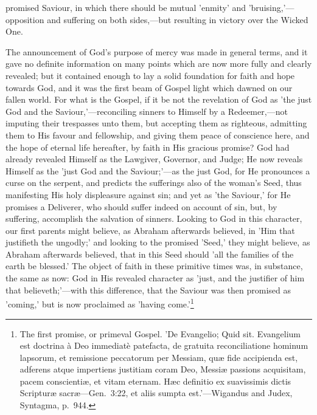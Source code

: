 \documentclass[
]{book}
\begin{document}
promised Saviour, in which there should be mutual 'enmity' and 'bruising,'---opposition and suffering on both sides,---but resulting in victory over the Wicked One.

The announcement of God's purpose of mercy was made in general terms, and it gave no definite information on many points which are now more fully and clearly revealed; but it contained enough to lay a solid foundation for faith and hope towards God, and it was the first beam of Gospel light which dawned on our fallen world. For what is the Gospel, if it be not the revelation of God as 'the just God and the Saviour,'---reconciling sinners to Himself by a Redeemer,---not imputing their trespasses unto them, but accepting them as righteous, admitting them to His favour and fellowship, and giving them peace of conscience here, and the hope of eternal life hereafter, by faith in His gracious promise? God had already revealed Himself as the Lawgiver, Governor, and Judge; He now reveals Himself as the 'just God and the Saviour;'---as the just God, for He pronounces a curse on the serpent, and predicts the sufferings also of the woman's Seed, thus manifesting His holy displeasure against sin; and yet as 'the Saviour,' for He promises a Deliverer, who should suffer indeed on account of sin, but, by suffering, accomplish the salvation of sinners. Looking to God in this character, our first parents might believe, as Abraham afterwards believed, in 'Him that justifieth the ungodly;' and looking to the promised 'Seed,' they might believe, as Abraham afterwards believed, that in this Seed should 'all the families of the earth be blessed.' The object of faith in these primitive times was, in substance, the same as now: God in His revealed character as 'just, and the justifier of him that believeth;'---with this difference, that the Saviour was then promised as 'coming,' but is now proclaimed as 'having come.'\footnote{The first promise, or primeval Gospel. 'De Evangelio; Quid sit. Evangelium est doctrina à Deo immediatè patefacta, de gratuita reconciliatione hominum lapsorum, et remissione peccatorum per Messiam, quæ fide accipienda est, adferens atque impertiens justitiam coram Deo, Messiæ passions acquisitam, pacem conscientiæ, et vitam eternam. Hæc definitio ex suavissimis dictis Scripturæ sacræ---Gen.~3:22, et aliis sumpta est.'---Wigandus and Judex, Syntagma, p.~944.

}
\end{document}
